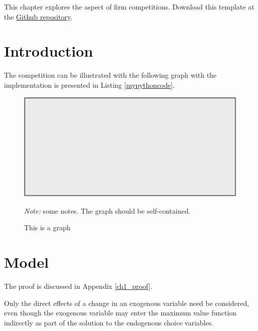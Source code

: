 This chapter explores the aspect of firm competitions. \lipsum[11] \lipsum[11]Download this template at the \href{https://github.com/howardhsumail/Dissertation-LaTeX-Template.git}{Github repository}.

\section{Introduction}

The {\color{mycolor}competition} can be illustrated with the following graph with the implementation is presented in Listing \ref{mypythoncode}. \lipsum[14]

\begin{figure}[H]
  \centering
  \caption{This is a graph}
  \includegraphics[scale=0.5]{Graph/pic.pdf}
  \hspace*{-0.6cm}
  \begin{minipage}{0.9\textwidth}
    \onehalfspacing
    \vspace*{0.12cm}
    \begin{tablenotes}
      \footnotesize
      \item\textit{Note:} some notes. The graph should be self-contained. \lipsum[66]
    \end{tablenotes}
  \end{minipage}
\end{figure}

\section{Model}
\lipsum[3-4] The proof is discussed in Appendix \ref{ch1_proof}.

\begin{theorem}
  Only the direct effects of a change in an exogenous variable need be considered, even though the exogenous variable may enter the maximum value function indirectly as part of the solution to the endogenous choice variables.
\end{theorem}

